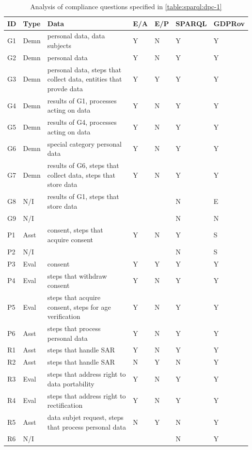 \begin{table}[htbp]
\footnotesize
\centering
\caption{Analysis of compliance questions specified in \autoref{table:sparql:dpc-1}}
\begin{tabularx}{\textwidth}{|l|l|X|l|l|l|l|}
\hline
ID & Type & Data & E/A & E/P & SPARQL & GDPRov \\ \hline
G1 & Demn & personal data, data subjects & Y & N & Y & Y \\ \hline
G2 & Demn & personal data & Y & N & Y & Y \\ \hline
G3 & Demn & personal data, steps that collect data, entities that provde data & Y & Y & Y & Y \\ \hline
G4 & Demn & results of G1, processes acting on data & Y & N & Y & Y \\ \hline
G5 & Demn & results of G4, processes acting on data & Y & N & Y & Y \\ \hline
G6 & Demn & special category personal data & Y & N & Y & Y \\ \hline
G7 & Demn & results of G6, steps that collect data, steps that store data & Y & N & Y & Y \\ \hline
G8 & N/I & results of G1, steps that store data &  &  & N & E \\ \hline
G9 & N/I &  &  &  & N & N \\ \hline
P1 & Asst & consent, steps that acquire consent & Y & N & Y & S \\ \hline
P2 & N/I &  &  &  & N & S \\ \hline
P3 & Eval & consent & Y & Y & Y & Y \\ \hline
P4 & Eval & steps that withdraw consent & Y & N & Y & Y \\ \hline
P5 & Eval & steps that acquire consent, steps for age verification & Y & N & Y & Y \\ \hline
P6 & Asst & steps that process personal data & Y & N & Y & Y \\ \hline
R1 & Asst & steps that handle SAR & Y & N & Y & Y \\ \hline
R2 & Asst & steps that handle SAR & N & Y & N & Y \\ \hline
R3 & Eval & steps that address right to data portability & Y & N & Y & Y \\ \hline
R4 & Eval & steps that address right to rectification & Y & N & Y & Y \\ \hline
R5 & Asst & data subjet request, steps that process personal data & N & Y & N & Y \\ \hline
R6 & N/I &  &  &  & N & Y \\ \hline

\end{tabularx}
\end{table}
